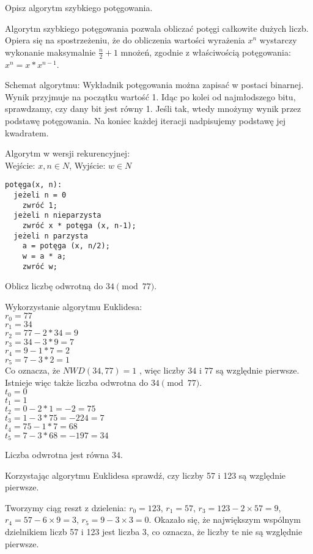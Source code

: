 \documentclass[answers,11pt]{exam}
\begin{document}
\begin{questions}
\question Opisz algorytm szybkiego potęgowania.
\begin{solution}
Algorytm szybkiego potęgowania pozwala obliczać potęgi całkowite dużych liczb. Opiera się na spostrzeżeniu, że do obliczenia wartości wyrażenia $x^n$ wystarczy wykonanie maksymalnie $\frac{n}{2} + 1$ mnożeń, zgodnie z właściwością potęgowania: $x^n = x * x^{n-1}$.

Schemat algorytmu: 
Wykładnik potęgowania można zapisać w postaci binarnej. Wynik przyjmuje na początku wartość 1. Idąc po kolei od najmłodszego bitu, sprawdzamy, czy dany bit jest równy 1. Jeśli tak, wtedy mnożymy wynik przez podstawę potęgowania. Na koniec każdej iteracji nadpisujemy podstawę jej kwadratem. 

\medskip
Algorytm w wersji rekurencyjnej:\\
Wejście: $x,n \in N$,
Wyjście: $w \in N$
\begin{verbatim}
potęga(x, n):
  jeżeli n = 0 
    zwróć 1;
  jeżeli n nieparzysta
    zwróć x * potęga (x, n-1);
  jeżeli n parzysta
    a = potęga (x, n/2);
    w = a * a;
    zwróć w;
\end{verbatim}

\end{solution}

\question Oblicz liczbę odwrotną do $34 \pmod{77}$.
\begin{solution}
Wykorzystanie algorytmu Euklidesa:\\
$r_0 = 77$\\
$r_1 = 34$\\
$r_2 = 77 - 2*34 = 9$\\
$r_3 = 34 - 3*9 = 7$\\
$r_4 = 9 - 1*7 = 2$\\
$r_5 = 7 - 3*2 = 1$\\
Co oznacza, że $NWD(34,77) = 1$ , więc liczby $34$ i $77$ są względnie pierwsze. Istnieje więc także liczba odwrotna do $34 \pmod{77}$.\\
$t_0 = 0$\\
$t_1 = 1$\\
$t_2 = 0 - 2*1 = -2 = 75$\\
$t_3 = 1 - 3*75 = -224 = 7$\\
$t_4 = 75 - 1*7 = 68$\\
$t_5 = 7 - 3*68 = -197 = 34$

Liczba odwrotna jest równa $34$.
\end{solution}

\question Korzystając algorytmu Euklidesa sprawdź, czy liczby 57 i 123 są względnie pierwsze.
\begin{solution}
Tworzymy ciąg reszt z dzielenia:
$r_0 = 123$, $r_1 = 57$, $r_3 = 123 - 2 \times 57 = 9$, $r_4 = 57 - 6 \times 9 = 3$, 
$r_5 = 9 - 3 \times 3 = 0$. Okazało się, że największym wspólnym dzielnikiem liczb 57 i 123 jest liczba 3, co oznacza, że liczby te nie są względnie pierwsze.
\end{solution}


\end{questions}
\end{document}
